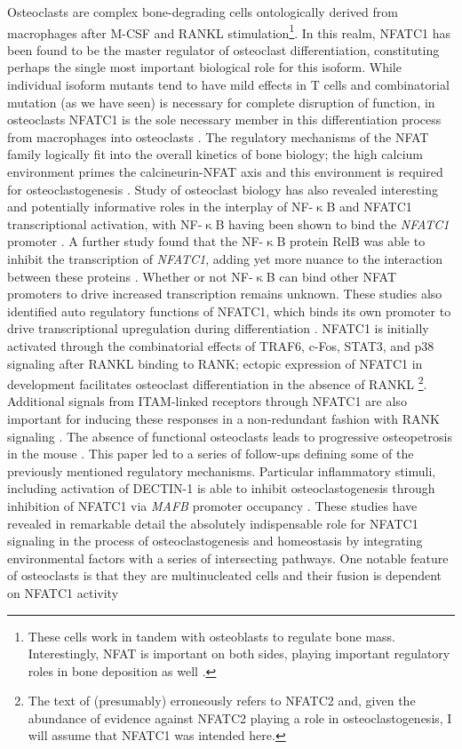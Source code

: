 Osteoclasts are complex bone\hyp{}degrading cells ontologically derived from macrophages after M\hyp{}CSF and RANKL stimulation\footnote{These cells work in tandem with osteoblasts to regulate bone mass. Interestingly, NFAT is important on both sides, playing important regulatory roles in bone deposition as well \citep{Winslow2006}.}. In this realm, NFATC1 has been found to be the master regulator of osteoclast differentiation, constituting perhaps the single most important biological role for this isoform. While individual isoform mutants tend to have mild effects in T cells and combinatorial mutation (as we have seen) is necessary for complete disruption of function, in osteoclasts NFATC1 is the sole necessary member in this differentiation process from macrophages into osteoclasts \citep{Kim2014}. The regulatory mechanisms of the NFAT family logically fit into the overall kinetics of bone biology; the high calcium environment primes the calcineurin\hyp{}NFAT axis and this environment is required for osteoclastogenesis \citep{NegishiKoga2009}. Study of osteoclast biology has also revealed interesting and potentially informative roles in the interplay of NF\hyp{}$\upkappa$B and NFATC1 transcriptional activation, with NF\hyp{}$\upkappa$B having been shown to bind the \textit{NFATC1} promoter \citep{Muhammad2014}. A further study found that the NF\hyp{}$\upkappa$B protein RelB was able to inhibit the transcription of \textit{NFATC1}, adding yet more nuance to the interaction between these proteins \citep{Zhao2015}. Whether or not NF\hyp{}$\upkappa$B can bind other NFAT promoters to drive increased transcription remains unknown. These studies also identified auto regulatory functions of NFATC1, which binds its own promoter to drive transcriptional upregulation during differentiation \citep{Asagiri2005}. NFATC1 is initially activated through the combinatorial effects of TRAF6, c\hyp{}Fos, STAT3, and p38 signaling after RANKL binding to RANK; ectopic expression of NFATC1 in development facilitates osteoclast differentiation in the absence of RANKL \citep{Takayanagi2002, Huang2006, Yang2019, Matsumoto2004, Huang2020}\footnote{The text of \citep{Huang2020} (presumably) erroneously refers to NFATC2 and, given the abundance of evidence against NFATC2 playing a role in osteoclastogenesis, I will assume that NFATC1 was intended here.}. Additional signals from ITAM\hyp{}linked receptors through NFATC1 are also important for inducing these responses in a non\hyp{}redundant fashion with RANK signaling \citep{Koga2004}. The absence of functional osteoclasts leads to progressive osteopetrosis in the mouse \citep{Takayanagi2002, Kim2014}. This paper led to a series of follow\hyp{}ups defining some of the previously mentioned regulatory mechanisms. Particular inflammatory stimuli, including activation of DECTIN\hyp{}1 is able to inhibit osteoclastogenesis through inhibition of NFATC1 via \textit{MAFB} promoter occupancy \citep{Zhu2017}. These studies have revealed in remarkable detail the absolutely indispensable role for NFATC1 signaling in the process of osteoclastogenesis and homeostasis by integrating environmental factors with a series of intersecting pathways. One notable feature of osteoclasts is that they are multinucleated cells and their fusion is dependent on NFATC1 activity 